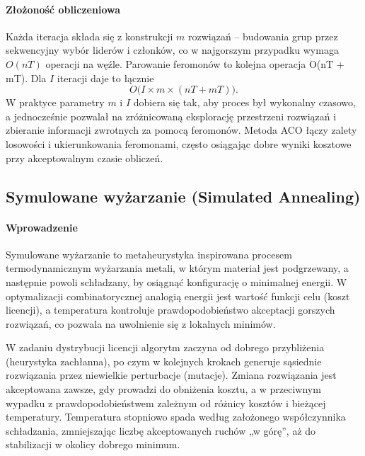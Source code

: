 \paragraph{Złożoność obliczeniowa}  
Każda iteracja składa się z konstrukcji $m$ rozwiązań – budowania grup przez sekwencyjny wybór liderów i członków, co w najgorszym przypadku wymaga $O(nT)$ operacji na węźle. Parowanie feromonów to kolejna operacja O(nT + mT). Dla $I$ iteracji daje to łącznie
\[
  O\bigl(I \times m \times (nT + mT)\bigr).
\]
W praktyce parametry $m$ i $I$ dobiera się tak, aby proces był wykonalny czasowo, a jednocześnie pozwalał na zróżnicowaną eksplorację przestrzeni rozwiązań i zbieranie informacji zwrotnych za pomocą feromonów. Metoda ACO łączy zalety losowości i ukierunkowania feromonami, często osiągając dobre wyniki kosztowe przy akceptowalnym czasie obliczeń.

\subsection{Symulowane wyżarzanie (Simulated Annealing)}

\paragraph{Wprowadzenie}  
Symulowane wyżarzanie to metaheurystyka inspirowana procesem termodynamicznym wyżarzania metali, w którym materiał jest podgrzewany, a następnie powoli schładzany, by osiągnąć konfigurację o minimalnej energii. W optymalizacji combinatorycznej analogią energii jest wartość funkcji celu (koszt licencji), a temperatura kontroluje prawdopodobieństwo akceptacji gorszych rozwiązań, co pozwala na uwolnienie się z lokalnych minimów.  

W zadaniu dystrybucji licencji algorytm zaczyna od dobrego przybliżenia (heurystyka zachłanna), po czym w kolejnych krokach generuje sąsiednie rozwiązania przez niewielkie perturbacje (mutacje). Zmiana rozwiązania jest akceptowana zawsze, gdy prowadzi do obniżenia kosztu, a w przeciwnym wypadku z prawdopodobieństwem zależnym od różnicy kosztów i bieżącej temperatury. Temperatura stopniowo spada według założonego współczynnika schładzania, zmniejszając liczbę akceptowanych ruchów „w górę”, aż do stabilizacji w okolicy dobrego minimum.

